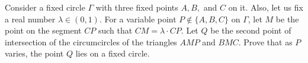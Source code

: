 Consider a fixed circle $\Gamma$ with three fixed points $A, B,$ and $C$ on it.
Also, let us fix a real number $\lambda \in(0,1)$.
For a variable point $P \not\in\{A, B, C\}$ on $\Gamma$, let $M$ be the point on the segment $CP$ such that $CM =\lambda\cdot  CP$.
Let $Q$ be the second point of intersection of the circumcircles of the triangles $AMP$ and $BMC$.
Prove that as $P$ varies, the point $Q$ lies on a fixed circle.
